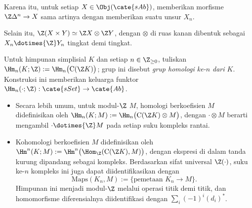 Karena itu, untuk setiap $X\in\Obj(\cate{sAb})$, memberikan morfisme
$\Z\Delta^n\to X$ sama artinya dengan memberikan suatu unsur $X_n$.

Selain itu, $\Z(X\times Y)\simeq\Z X\otimes\Z Y$, dengan $\otimes$ di
ruas kanan dibentuk sebagai $X_n\dotimes{\Z}Y_n$ tingkat demi tingkat.

\begin{definition}\label{def:simplicial-set-homology}
	Untuk himpunan simplisial $K$ dan setiap $n\in\Z_{\geq0}$, tuliskan
	$\Hm_n(K;\Z):=\Hm_n\bigl(\mathrm{C}(\Z K)\bigr)$; grup ini disebut
	\emph{grup homologi ke-$n$ dari $K$}. Konstruksi ini memberikan keluarga
	funktor $\Hm_n(\cdot;\Z):\cate{sSet}\to\cate{Ab}$.
	\begin{itemize}
		\item Secara lebih umum, untuk modul-$\Z$ $M$, homologi berkoefisien
		$M$ didefinisikan oleh
		$\Hm_n(K;M):=\Hm_n\bigl(\mathrm{C}(\Z K)\otimes M\bigr)$, dengan
		$\mathord\cdot\otimes M$ berarti mengambil
		$\mathord\cdot\dotimes{\Z}M$ pada setiap suku kompleks rantai.

		\item Kohomologi berkoefisien $M$ didefinisikan oleh
		$\Hm^n(K;M):=\Hm^n\bigl(\Hom_{\Z}(\mathrm{C}(\Z K),M)\bigr)$, dengan
		ekspresi di dalam tanda kurung dipandang sebagai kompleks. Berdasarkan
		sifat universal $\Z(\cdot)$, suku ke-$n$ kompleks ini juga dapat
		diidentifikasikan dengan
		\[
		\mathrm{Maps}(K_n,M):=\{\text{pemetaan }K_n\to M\}.
		\]
		Himpunan ini menjadi modul-$\Z$ melalui operasi titik demi titik, dan
		homomorfisme diferensialnya diidentifikasi dengan
		$\sum_i(-1)^i(d_i)^*$.
	\end{itemize}
\end{definition}

